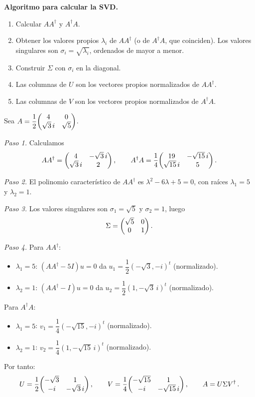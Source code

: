 \textbf{Algoritmo para calcular la SVD.}
\begin{enumerate}
  \item Calcular $AA^\dagger$ y $A^\dagger A$.
  \item Obtener los valores propios $\lambda_i$ de $AA^\dagger$ (o de $A^\dagger A$, que coinciden). Los valores singulares son $\sigma_i=\sqrt{\lambda_i}$, ordenados de mayor a menor.
  \item Construir $\Sigma$ con $\sigma_i$ en la diagonal.
  \item Las columnas de $U$ son los vectores propios normalizados de $AA^\dagger$.
  \item Las columnas de $V$ son los vectores propios normalizados de $A^\dagger A$.
\end{enumerate}

\begin{eje}
  Sea $A = \dfrac{1}{2}\mqty(4 & 0 \\ \sqrt{3}\,i & \sqrt{5})$.

  \textit{Paso 1.} Calculamos
  \[
    AA^\dagger = \mqty(4 & -\sqrt{3}\,i \\ \sqrt{3}\,i & 2)\,,\qquad
    A^\dagger A = \frac{1}{4}\mqty(19 & -\sqrt{15}\,i \\ \sqrt{15}\,i & 5)\,.
  \]

  \textit{Paso 2.} El polinomio característico de $AA^\dagger$ es $\lambda^2-6\lambda+5=0$, con raíces $\lambda_1=5$ y $\lambda_2=1$.

  \textit{Paso 3.} Los valores singulares son $\sigma_1=\sqrt{5}$ y $\sigma_2=1$, luego
  \[
    \Sigma = \mqty(\sqrt{5} & 0 \\ 0 & 1)\,.
  \]

  \textit{Paso 4.} Para $AA^\dagger$:
  \begin{itemize}
    \item $\lambda_1=5$: $(AA^\dagger-5I)u=0$ da $u_1 = \dfrac{1}{2}(-\sqrt{3},-i)^t$ (normalizado).
    \item $\lambda_2=1$: $(AA^\dagger-I)u=0$ da $u_2 = \dfrac{1}{2}(1,-\sqrt{3}\,i)^t$ (normalizado).
  \end{itemize}
  Para $A^\dagger A$:
  \begin{itemize}
    \item $\lambda_1=5$: $v_1 = \dfrac{1}{4}(-\sqrt{15},-i)^t$ (normalizado).
    \item $\lambda_2=1$: $v_2 = \dfrac{1}{4}(1,-\sqrt{15}\,i)^t$ (normalizado).
  \end{itemize}
  Por tanto:
  \[
    U = \frac{1}{2}\mqty(-\sqrt{3} & 1 \\ -i & -\sqrt{3}\,i)\,,\qquad
    V = \frac{1}{4}\mqty(-\sqrt{15} & 1 \\ -i & -\sqrt{15}\,i)\,,\qquad
    A = U\Sigma V^\dagger\,.
  \]
\end{eje}
